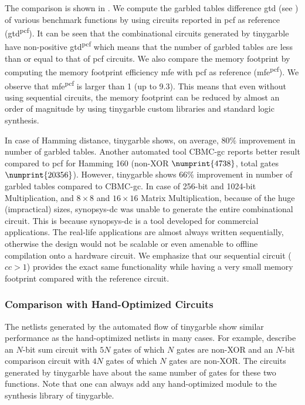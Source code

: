 The comparison is shown in .
We compute the garbled tables difference \acrshort{gtd} (see ) of various benchmark functions by using circuits reported in \gls{pcf} as reference (\acrshort{gtd}\textsuperscript{\gls{pcf}}).
It can be seen that the combinational circuits generated by \gls{tinygarble} have non-positive \acrshort{gtd}\textsuperscript{\gls{pcf}} which means that the number of garbled tables are less than or equal to that of \gls{pcf} circuits.
We also compare the memory footprint by computing the memory footprint efficiency \acrshort{mfe} with \gls{pcf} as reference (\acrshort{mfe}\textsuperscript{\gls{pcf}}).
We observe that \acrshort{mfe}\textsuperscript{\gls{pcf}} is larger than 1 (up to 9.3).
This means that even without using sequential circuits, the memory footprint can be reduced by almost an order of magnitude by using \gls{tinygarble} custom libraries and standard logic synthesis.

In case of Hamming distance, \gls{tinygarble} shows, on average, $80\%$ improvement in number of garbled tables.
Another automated tool CBMC-\acrshort{gc} \cite{franz2014cbmc} reports better result compared to \gls{pcf} for Hamming 160 (non-XOR $\numprint{4738}$, total gates $\numprint{20356}$).
However, \gls{tinygarble} shows $66\%$ improvement in number of garbled tables compared to CBMC-\acrshort{gc}.
In case of 256-bit and 1024-bit Multiplication, and $8\times 8$ and $16\times 16$ Matrix Multiplication, because of the huge (impractical) sizes, \gls{synopsys-dc} was unable to generate the entire combinational circuit.
This is because \gls{synopsys-dc} is a tool developed for commercial applications.
The real-life applications are almost always written sequentially, otherwise the design would not be scalable or even amenable to offline compilation onto a hardware circuit.
We emphasize that our sequential circuit ($cc>1$) provides the exact same functionality while having a very small memory footprint compared with the reference circuit.

\subsubsection{Comparison with Hand-Optimized Circuits} \label{sssec:eval-tinygarble-comb-hand}
The \gls{netlist}s generated by the automated flow of \gls{tinygarble} show similar performance as the hand-optimized \gls{netlist}s in many cases.
For example, \cite{kolesnikov2009improved} describe an $N$-bit sum circuit with $5N$ gates of which $N$ gates are non-XOR and an $N$-bit comparison circuit with $4N$ gates of which $N$ gates are non-XOR.
The circuits generated by \gls{tinygarble} have about the same number of gates for these two functions.
Note that one can always add any hand-optimized module to the synthesis library of \gls{tinygarble}.

